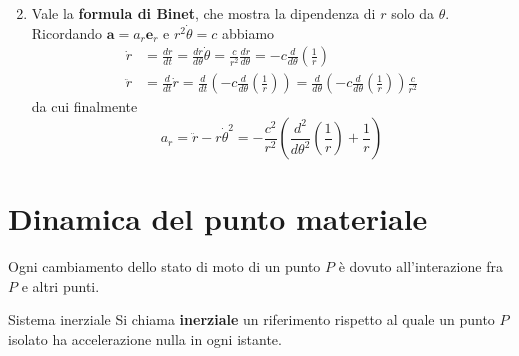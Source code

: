\begin{enumerate}[label = \arabic*.]
\[        \]
    \item Vale la \textbf{formula di Binet}, che mostra la dipendenza di \(r\)
        solo da \(\theta\). Ricordando \(\mathbf{a} =a_r
        \mathbf{e}_r\) e \(r^2\dot{\theta} = c\) abbiamo
        \begin{align*}
            \dot{r} &= \frac{dr}{dt} = \frac{dr}{d\theta}\dot{\theta} =
          \frac{c}{r^2} \frac{dr}{d\theta} = -c \frac{d}{d\theta} {\left(
          \frac{1}{r} \right)} \\
            \ddot{r} &= \frac{d}{dt}\dot{r} = \frac{d}{dt} {\left( -c
            \frac{d}{d\theta}{\left( \frac{1}{r} \right)}  \right)} =
            \frac{d}{d\theta} {\left( -c \frac{d}{d\theta}{\left( \frac{1}{r}
            \right)}  \right)} \frac{c}{r^2}
        \end{align*}
        da cui finalmente
        \begin{equation}\label{eq:binet}
        a_r = \ddot{r} - r\dot{\theta}^2 = -\frac{c^2}{r^2} {\left(
        \frac{d^2}{d\theta^2}{\left( \frac{1}{r} \right)} + \frac{1}{r} \right)} 
        \end{equation}

\end{enumerate}

\section{Dinamica del punto materiale}
Ogni cambiamento dello stato di moto di un punto \(P\) è dovuto all'interazione
fra \(P\) e altri punti. 

\begin{definition}{Sistema inerziale}
    Si chiama \textbf{inerziale} un riferimento rispetto al quale un punto \(P\)
    isolato ha accelerazione nulla in ogni istante.
\end{definition}





